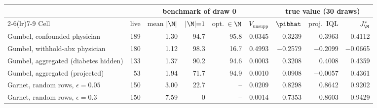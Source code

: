 \begin{tabular}{lrrrrrrrr}
\toprule
 & \multicolumn{5}{c}{benchmark of draw 0} & \multicolumn{3}{c}{true value (30 draws)} \\
\cmidrule(lr){2-6}\cmidrule(lr){7-9}
Cell & live & mean $|\M|$ & $|\M|{=}1$ & opt.\ $\in\M$ & $V_{\mathrm{unsupp}}$ & $\pibhat$ & proj.\ IQL & $J^*_{\M}$ \\
\midrule
Gumbel, confounded physician & 189 & 1.30 & 94.7 & 95.8 & 0.0345 & 0.3239 & 0.3963 & 0.4112 \\
Gumbel, withhold-abx physician & 180 & 1.12 & 98.3 & 16.7 & 0.4993 & $-$0.2579 & $-$0.2099 & $-$0.0665 \\
Gumbel, aggregated (diabetes hidden) & 133 & 1.37 & 90.2 & 94.6 & 0.0003 & 0.3208 & 0.4008 & 0.4359 \\
Gumbel, aggregated (projected) & 53 & 1.94 & 71.7 & 94.9 & 0.0010 & 0.0908 & $-$0.0057 & 0.4361 \\
Garnet, random rows, $\epsilon{=}0.05$ & 150 & 3.00 & 22.7 & -- & 0.0209 & 0.8298 & 0.8642 & 0.9202 \\
Garnet, random rows, $\epsilon{=}0.3$ & 150 & 7.59 & 0 & -- & 0.0014 & 0.7353 & 0.8603 & 0.9429 \\
\bottomrule
\end{tabular}
